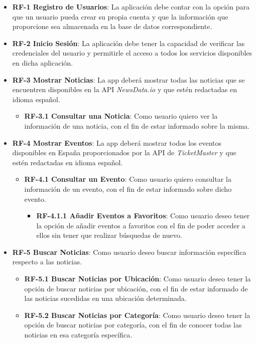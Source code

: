 \begin{itemize}
    \item \textbf{RF-1 Registro de Usuarios}: La aplicación debe contar con la opción para que un usuario pueda crear su propia cuenta y que la información que proporcione sea almacenada en la base de datos correspondiente.
    \item \textbf{RF-2 Inicio Sesión}: La aplicación debe tener la capacidad de verificar las credenciales del usuario y permitirle el acceso a todos los servicios disponibles en dicha aplicación.
    \item \textbf{RF-3 Mostrar Noticias}: La app deberá mostrar todas las noticias que se encuentren disponibles en la API \textit{NewsData.io} y que estén redactadas en idioma español.
    \begin{itemize}
         \item \textbf{RF-3.1 Consultar una Noticia}: Como usuario quiero ver la información  de una noticia, con el fin de estar informado sobre la misma.
     \end{itemize}
    \item \textbf{RF-4 Mostrar Eventos}: La app deberá mostrar todos los eventos disponibles en España proporcionados por la API de \textit{TicketMaster}  
    y que estén redactadas en idioma español.
    \begin{itemize}
        \item \textbf{RF-4.1 Consultar un Evento}: Como usuario quiero consultar la información  de un evento, con el fin de estar informado sobre dicho evento.
        \begin{itemize}
            \item \textbf{RF-4.1.1 Añadir Eventos a Favoritos}: Como usuario deseo tener la opción de añadir eventos a favoritos con el fin de poder acceder a ellos sin tener que realizar búsquedas de nuevo.
        \end{itemize}
    \end{itemize}
    
    \item \textbf{RF-5 Buscar Noticias}: Como usuario deseo buscar información específica respecto a las noticias.
    \begin{itemize}
        \item  \textbf{RF-5.1 Buscar Noticias por Ubicación}: Como usuario deseo tener la opción de buscar noticias por ubicación, con el fin de estar informado de las noticias sucedidas en una ubicación determinada.
        \item  \textbf{RF-5.2 Buscar Noticias por Categoría}: Como usuario deseo tener la opción de buscar noticias por categoría, con el fin de conocer todas las noticias en esa categoría específica. 
    \end{itemize}
    

\end{itemize}
